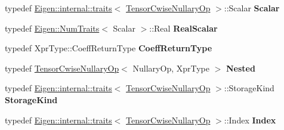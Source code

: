 \begin{DoxyCompactItemize}
\mbox{\label{class_eigen_1_1_tensor_cwise_nullary_op_a413b428db1a77ed81fc72a42a8dd8047}} 
typedef \hyperlink{struct_eigen_1_1internal_1_1traits}{Eigen\+::internal\+::traits}$<$ \hyperlink{class_eigen_1_1_tensor_cwise_nullary_op}{Tensor\+Cwise\+Nullary\+Op} $>$\+::Scalar {\bfseries Scalar}
\item 
\mbox{\label{class_eigen_1_1_tensor_cwise_nullary_op_a66de12785cab6bf0c2fb8c8261fe1ec6}} 
typedef \hyperlink{group___core___module_struct_eigen_1_1_num_traits}{Eigen\+::\+Num\+Traits}$<$ Scalar $>$\+::Real {\bfseries Real\+Scalar}
\item 
\mbox{\label{class_eigen_1_1_tensor_cwise_nullary_op_a6c9799f6ef5aa320749f7434b6c7b1e1}} 
typedef Xpr\+Type\+::\+Coeff\+Return\+Type {\bfseries Coeff\+Return\+Type}
\item 
\mbox{\label{class_eigen_1_1_tensor_cwise_nullary_op_a399505693e1a2518183c7a8159cd6156}} 
typedef \hyperlink{class_eigen_1_1_tensor_cwise_nullary_op}{Tensor\+Cwise\+Nullary\+Op}$<$ Nullary\+Op, Xpr\+Type $>$ {\bfseries Nested}
\item 
\mbox{\label{class_eigen_1_1_tensor_cwise_nullary_op_a670e320d18c51f0d943df8309192958d}} 
typedef \hyperlink{struct_eigen_1_1internal_1_1traits}{Eigen\+::internal\+::traits}$<$ \hyperlink{class_eigen_1_1_tensor_cwise_nullary_op}{Tensor\+Cwise\+Nullary\+Op} $>$\+::Storage\+Kind {\bfseries Storage\+Kind}
\item 
\mbox{\label{class_eigen_1_1_tensor_cwise_nullary_op_a970d73110f02d1ccbf02eee3607ef639}} 
typedef \hyperlink{struct_eigen_1_1internal_1_1traits}{Eigen\+::internal\+::traits}$<$ \hyperlink{class_eigen_1_1_tensor_cwise_nullary_op}{Tensor\+Cwise\+Nullary\+Op} $>$\+::Index {\bfseries Index}
\end{DoxyCompactItemize}
